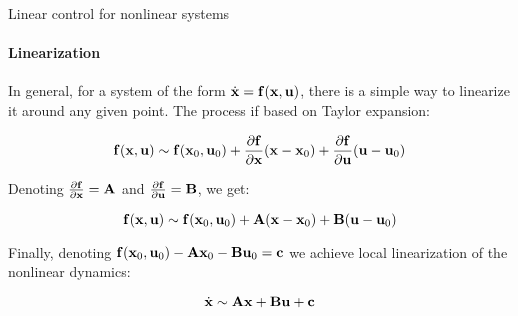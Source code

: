 \documentclass{beamer}
\begin{document}
\begin{frame}{Linear control for nonlinear systems}
\framesubtitle{Linearization}
\begin{flushleft}

In general, for a system of the form $\dot{\mathbf{x}} = \mathbf{f}(\mathbf{x}, \mathbf{u})$, there is a simple way to linearize it around any given point. The process if based on Taylor expansion:

\begin{equation}
    \mathbf{f}(\mathbf{x}, \mathbf{u}) 	\sim \mathbf{f}(\mathbf{x}_0, \mathbf{u}_0) +
    \frac{\partial \mathbf{f}}{\partial \mathbf{x}} (\mathbf{x} - \mathbf{x}_0) + 
    \frac{\partial \mathbf{f}}{\partial \mathbf{u}} (\mathbf{u} - \mathbf{u}_0)
\end{equation}

Denoting $\frac{\partial \mathbf{f}}{\partial \mathbf{x}} = \mathbf{A}$ and $\frac{\partial \mathbf{f}}{\partial \mathbf{u}} = \mathbf{B}$, we get:

\begin{equation}
    \mathbf{f}(\mathbf{x}, \mathbf{u}) 	\sim \mathbf{f}(\mathbf{x}_0, \mathbf{u}_0) +
    \mathbf{A} (\mathbf{x} - \mathbf{x}_0) + 
    \mathbf{B} (\mathbf{u} - \mathbf{u}_0)
\end{equation}

Finally, denoting $ \mathbf{f}(\mathbf{x}_0, \mathbf{u}_0) - \mathbf{A}\mathbf{x}_0 - \mathbf{B} \mathbf{u}_0 = \mathbf{c}$ we achieve local linearization of the nonlinear dynamics:

\begin{equation}
    \dot{\mathbf{x}} \sim \mathbf{A} \mathbf{x} + 
    \mathbf{B} \mathbf{u} + \mathbf{c}
\end{equation}


\end{flushleft}
\end{frame}
\end{document}
